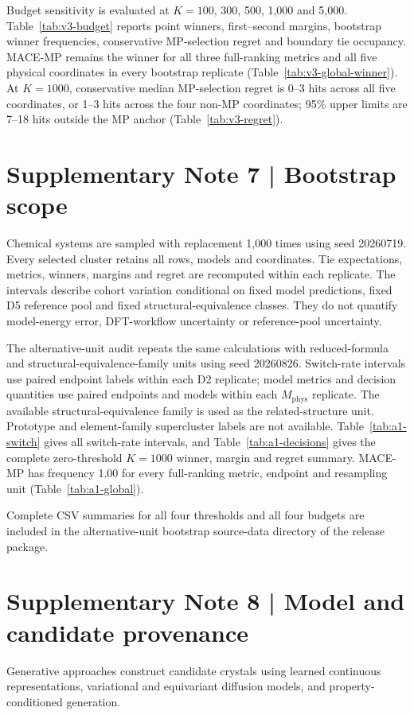 \documentclass[a4paper,10pt]{article}
\begin{document}
Budget sensitivity is evaluated at $K=100$, 300, 500, 1,000 and 5,000. Table~\ref{tab:v3-budget} reports point winners, first--second margins, bootstrap winner frequencies, conservative MP-selection regret and boundary tie occupancy. MACE-MP remains the winner for all three full-ranking metrics and all five physical coordinates in every bootstrap replicate (Table~\ref{tab:v3-global-winner}). At $K=1000$, conservative median MP-selection regret is 0--3 hits across all five coordinates, or 1--3 hits across the four non-MP coordinates; 95\% upper limits are 7--18 hits outside the MP anchor (Table~\ref{tab:v3-regret}).

\section*{Supplementary Note 7 | Bootstrap scope}
Chemical systems are sampled with replacement 1,000 times using seed 20260719. Every selected cluster retains all rows, models and coordinates. Tie expectations, metrics, winners, margins and regret are recomputed within each replicate. The intervals describe cohort variation conditional on fixed model predictions, fixed D5 reference pool and fixed structural-equivalence classes. They do not quantify model-energy error, DFT-workflow uncertainty or reference-pool uncertainty.

The alternative-unit audit repeats the same calculations with reduced-formula and structural-equivalence-family units using seed 20260826. Switch-rate intervals use paired endpoint labels within each D2 replicate; model metrics and decision quantities use paired endpoints and models within each $M_{\mathrm{phys}}$ replicate. The available structural-equivalence family is used as the related-structure unit. Prototype and element-family supercluster labels are not available. Table~\ref{tab:a1-switch} gives all switch-rate intervals, and Table~\ref{tab:a1-decisions} gives the complete zero-threshold $K=1000$ winner, margin and regret summary. MACE-MP has frequency 1.00 for every full-ranking metric, endpoint and resampling unit (Table~\ref{tab:a1-global}).

Complete CSV summaries for all four thresholds and all four budgets are included in the alternative-unit bootstrap source-data directory of the release package.

\section*{Supplementary Note 8 | Model and candidate provenance}
Generative approaches construct candidate crystals using learned continuous representations,\cite{noh2019inverse} variational and equivariant diffusion models,\cite{xie2022crystal,jiao2023crystal} and property-conditioned generation.\cite{zeni2025generative}
\end{document}
